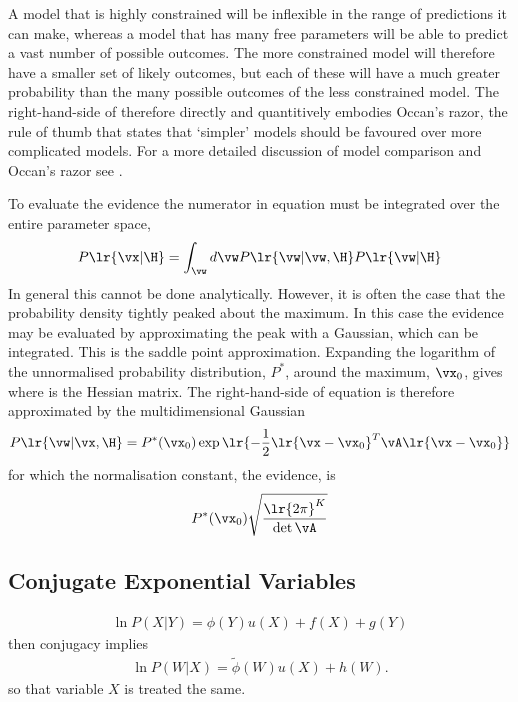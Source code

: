 {A model that is highly constrained will be inflexible in the range of predictions it can make,
whereas a model that has many free parameters will be able to predict a vast number of possible outcomes.
The more constrained model will therefore have a smaller set of likely outcomes,
but each of these will have a much greater probability than the many possible outcomes of the less constrained model.
The right-hand-side of  therefore directly and quantitively embodies Occan's razor,
the rule of thumb that states that `simpler' models should be favoured over more complicated models.
For a more detailed discussion of model comparison and Occan's razor see \cite[Chapter 28]{Mackay2003}.

To evaluate the evidence the numerator in equation  must be integrated over the entire parameter space,
\begin{align}
  P\lr{\vx|\H} = \int_\vw d\vw P\lr{\vw|\vw,\H} P\lr{\vw|\H}
\end{align}
In general this cannot be done analytically.
However, it is often the case that the probability density tightly peaked about the maximum.
In this case the evidence may be evaluated by approximating the peak with a Gaussian, which can be integrated.
This is the saddle point approximation.
Expanding the logarithm of the  unnormalised probability distribution, $P^\ast$, 
around the maximum, $\vx_0$,
gives
where 
is the Hessian matrix.
The right-hand-side of equation   is therefore approximated by the multidimensional Gaussian
\begin{align}
   P\lr{\vw|\vx,\H} = P^\ast(\vx_0) \exp \lr{- \frac{1}{2}\lr{\vx-\vx_0}^T \vA\lr{\vx-\vx_0 }}
\end{align}
for which the normalisation constant, the evidence, is 
\begin{align}
   P^\ast(\vx_0) \sqrt{\frac{\lr{2\pi}^K}{\det \vA}}
\end{align}


\subsection{Conjugate Exponential Variables}
\begin{align}
\ln P(X|Y) = \phi(Y) u(X) + f(X) + g(Y)
\end{align}
then conjugacy implies
\begin{align}
\ln P(W|X) = \tilde\phi(W) u(X) + h(W).
\end{align}
so that variable $X$ is treated the same.

}

